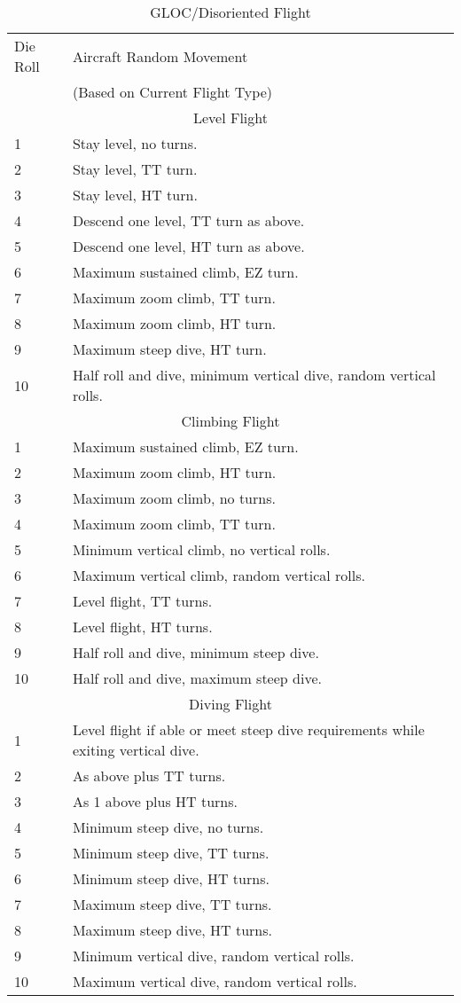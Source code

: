 \begin{table}
\centering

\caption{GLOC/Disoriented Flight}
\small
\medskip
\begin{tabular}{lp{6cm}}
\hline
Die Roll&Aircraft Random Movement\\
&(Based on Current Flight Type)\\
\hline
\multicolumn{2}{c}{Level Flight}\\
\hline
1   &Stay level, no turns.\\
2   &Stay level, TT turn.\\
3   &Stay level, HT turn.\\
4   &Descend one level, TT turn as above.\\
5   &Descend one level, HT turn as above.\\
6   &Maximum sustained climb, EZ turn.\\
7   &Maximum zoom climb, TT turn.\\
8   &Maximum zoom climb, HT turn.\\
9   &Maximum steep dive, HT turn.\\
10  &Half roll and dive, minimum vertical dive, random vertical rolls.\\
\hline
\multicolumn{2}{c}{Climbing Flight}\\
\hline
1   &Maximum sustained climb, EZ turn.\\
2   &Maximum zoom climb, HT turn.\\
3   &Maximum zoom climb, no turns.\\
4   &Maximum zoom climb, TT turn.\\
5   &Minimum vertical climb, no vertical rolls.\\
6   &Maximum vertical climb, random vertical rolls.\\
7   &Level flight, TT turns.\\
8   &Level flight, HT turns.\\
9   &Half roll and dive, minimum steep dive.\\
10  &Half roll and dive, maximum steep dive.\\
\hline
\multicolumn{2}{c}{Diving Flight}\\
\hline
1   &Level flight if able or meet steep dive requirements while exiting vertical dive.\\
2   &As above plus TT turns.\\
3   &As 1 above plus HT turns.\\
4   &Minimum steep dive, no turns.\\
5   &Minimum steep dive, TT turns.\\
6   &Minimum steep dive, HT turns.\\
7   &Maximum steep dive, TT turns.\\
8   &Maximum steep dive, HT turns.\\
9   &Minimum vertical dive, random vertical rolls.\\
10  &Maximum vertical dive, random vertical rolls.\\
\hline
\end{tabular}


\end{table}

